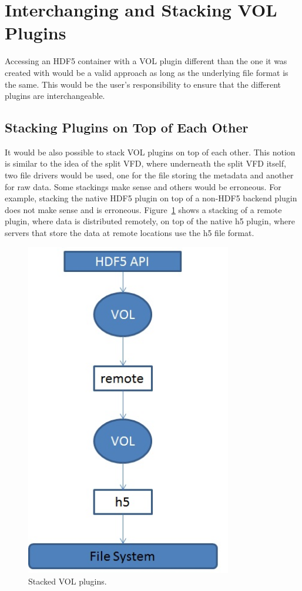 \section{Interchanging and Stacking VOL Plugins}
\label{sec:stack}

Accessing an HDF5 container with a VOL plugin different than the one
it was created with would be a valid approach as long as the
underlying file format is the same. This would be the user’s
responsibility to ensure that the different plugins are
interchangeable.

\subsection{Stacking Plugins on Top of Each Other}
It would be also possible to stack VOL plugins on top of each
other. This notion is similar to the idea of the split VFD, where
underneath the split VFD itself, two file drivers would be used, one
for the file storing the metadata and another for raw data. Some
stackings make sense and others would be erroneous. For example,
stacking the native HDF5 plugin on top of a non-HDF5 backend plugin
does not make sense and is erroneous. Figure~\ref{stack} shows a
stacking of a remote plugin, where data is distributed remotely, on
top of the native h5 plugin, where servers that store the data at
remote locations use the h5 file format.

\begin{figure}[ht!]
\centering
\includegraphics[width=90mm]{stacked.jpg}
\caption{Stacked VOL plugins.}
\label{stack}
\end{figure}

